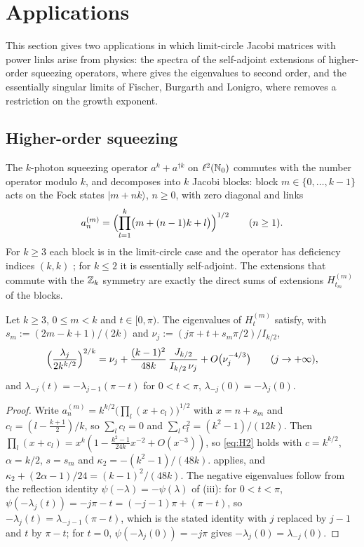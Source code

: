 \section{Applications}\label{sec:apps}

This section gives two applications in which limit-circle Jacobi matrices with power
links arise from physics: the spectra of the self-adjoint extensions of higher-order
squeezing operators, where  gives the eigenvalues to second order, and
the essentially singular limits of Fischer, Burgarth and Lonigro, where
 removes a restriction on the growth exponent.

\subsection{Higher-order squeezing}

The $k$-photon squeezing operator $a^k+a^{\dagger k}$ on $\ell^2(\mathbb{N}_0)$ commutes with the
number operator modulo $k$, and decomposes into $k$ Jacobi blocks: block $m\in\{0,\dots,k-1\}$
acts on the Fock states $|m+nk\rangle$, $n\ge0$, with zero diagonal and links
\[
  a^{(m)}_n=\Bigl(\prod_{l=1}^k\bigl(m+(n-1)k+l\bigr)\Bigr)^{1/2}\qquad(n\ge1).
\]
For $k\ge3$ each block is in the limit-circle case and the operator has deficiency indices
$(k,k)$ \cite{FBL2025,FBL2026}; for $k\le2$ it is essentially self-adjoint. The extensions that
commute with the $\mathbb{Z}_k$ symmetry are exactly the direct sums of extensions $H^{(m)}_{t_m}$ of
the blocks.

\begin{corollary}\label{cor:squeeze}
Let $k\ge3$, $0\le m<k$ and $t\in[0,\pi)$. The eigenvalues of $H^{(m)}_t$ satisfy, with
$s_m:=(2m-k+1)/(2k)$ and $\nu_j:=(j\pi+t+s_m\pi/2)/I_{k/2}$,
\[
  \Bigl(\frac{\lambda_j}{2k^{k/2}}\Bigr)^{2/k}=\nu_j+\frac{(k-1)^2}{48k}\,\frac{J_{k/2}}{I_{k/2}\,\nu_j}+O\bigl(\nu_j^{-4/3}\bigr)
  \qquad(j\to+\infty),
\]
and $\lambda_{-j}(t)=-\lambda_{j-1}(\pi-t)$ for $0<t<\pi$, $\lambda_{-j}(0)=-\lambda_j(0)$.
\end{corollary}

\begin{proof}
Write $a^{(m)}_n=k^{k/2}\bigl(\prod_l(x+c_l)\bigr)^{1/2}$ with $x=n+s_m$ and
$c_l=(l-\frac{k+1}2)/k$, so $\sum_lc_l=0$ and $\sum_lc_l^2=(k^2-1)/(12k)$. Then
$\prod_l(x+c_l)=x^k(1-\frac{k^2-1}{24k}x^{-2}+O(x^{-3}))$, so \eqref{eq:H2} holds with
$c=k^{k/2}$, $\alpha=k/2$, $s=s_m$ and $\kappa_2=-(k^2-1)/(48k)$.  applies, and
$\kappa_2+(2\alpha-1)/24=(k-1)^2/(48k)$. The negative eigenvalues follow from the reflection
identity $\psi(-\lambda)=-\psi(\lambda)$ of (iii): for $0<t<\pi$,
$\psi(-\lambda_j(t))=-j\pi-t=(-j-1)\pi+(\pi-t)$, so $-\lambda_j(t)=\lambda_{-j-1}(\pi-t)$, which is the stated
identity with $j$ replaced by $j-1$ and $t$ by $\pi-t$; for $t=0$, $\psi(-\lambda_j(0))=-j\pi$ gives
$-\lambda_j(0)=\lambda_{-j}(0)$.
\end{proof}

